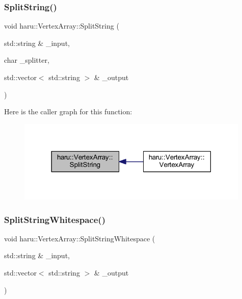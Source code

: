 \subsubsection{\texorpdfstring{Split\+String()}{SplitString()}}
{\footnotesize\ttfamily void haru\+::\+Vertex\+Array\+::\+Split\+String (\begin{DoxyParamCaption}\item[{std\+::string \&}]{\+\_\+input,  }\item[{char}]{\+\_\+splitter,  }\item[{std\+::vector$<$ std\+::string $>$ \&}]{\+\_\+output }\end{DoxyParamCaption})\hspace{0.3cm}{\ttfamily [private]}}

Here is the caller graph for this function\+:
\nopagebreak
\begin{figure}[H]
\begin{center}
\leavevmode
\includegraphics[width=314pt]{classharu_1_1_vertex_array_a8ca455fffbc9f554851fe18eb8a26bfa_icgraph}
\end{center}
\end{figure}
\mbox{\label{classharu_1_1_vertex_array_a4881c24fdca7f802456d1b8823a0c4ce}} 
\subsubsection{\texorpdfstring{Split\+String\+Whitespace()}{SplitStringWhitespace()}}
{\footnotesize\ttfamily void haru\+::\+Vertex\+Array\+::\+Split\+String\+Whitespace (\begin{DoxyParamCaption}\item[{std\+::string \&}]{\+\_\+input,  }\item[{std\+::vector$<$ std\+::string $>$ \&}]{\+\_\+output }\end{DoxyParamCaption})\hspace{0.3cm}{\ttfamily [private]}}

